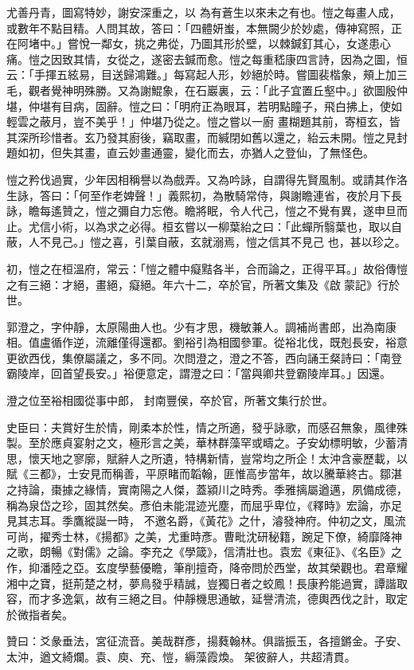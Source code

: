 \begin{pinyinscope}
 尤善丹青，圖寫特妙，謝安深重之，以
 為有蒼生以來未之有也。愷之每畫人成，或數年不點目精。人問其故，答曰：「四體妍蚩，本無闕少於妙處，傳神寫照，正在阿堵中。」嘗悅一鄰女，挑之弗從，乃圖其形於壁，以棘鍼釘其心，女遂患心痛。愷之因致其情，女從之，遂密去鍼而愈。愷之每重嵇康四言詩，因為之圖，恒云：「手揮五絃易，目送歸鴻難。」每寫起人形，妙絕於時。嘗圖裴楷象，頰上加三毛，觀者覺神明殊勝。又為謝鯤象，在石巖裏，云：「此子宜置丘壑中。」欲圖殷仲堪，仲堪有目病，固辭。愷之曰：「明府正為眼耳，若明點瞳子，飛白拂上，使如輕雲之蔽月，豈不美乎！」仲堪乃從之。愷之嘗以一廚
 畫糊題其前，寄桓玄，皆其深所珍惜者。玄乃發其廚後，竊取畫，而緘閉如舊以還之，紿云未開。愷之見封題如初，但失其畫，直云妙畫通靈，變化而去，亦猶人之登仙，了無怪色。



 愷之矜伐過實，少年因相稱譽以為戲弄。又為吟詠，自謂得先賢風制。或請其作洛生詠，答曰：「何至作老婢聲！」義熙初，為散騎常侍，與謝瞻連省，夜於月下長詠，瞻每遙贊之，愷之彌自力忘倦。瞻將眠，令人代己，愷之不覺有異，遂申旦而止。尤信小術，以為求之必得。桓玄嘗以一柳葉紿之曰：「此蟬所翳葉也，取以自蔽，人不見己。」愷之喜，引葉自蔽，玄就溺焉，愷之信其不見己
 也，甚以珍之。



 初，愷之在桓溫府，常云：「愷之體中癡黠各半，合而論之，正得平耳。」故俗傳愷之有三絕：才絕，畫絕，癡絕。年六十二，卒於官，所著文集及《啟蒙記》行於世。



 郭澄之，字仲靜，太原陽曲人也。少有才思，機敏兼人。調補尚書郎，出為南康相。值盧循作逆，流離僅得還都。劉裕引為相國參軍。從裕北伐，既剋長安，裕意更欲西伐，集僚屬議之，多不同。次問澄之，澄之不答，西向誦王粲詩曰：「南登霸陵岸，回首望長安。」裕便意定，謂澄之曰：「當與卿共登霸陵岸耳。」因還。



 澄之位至裕相國從事中郎，
 封南豐侯，卒於官，所著文集行於世。



 史臣曰：夫賞好生於情，剛柔本於性，情之所適，發乎詠歌，而感召無象，風律殊製。至於應貞宴射之文，極形言之美，華林群藻罕或疇之。子安幼標明敏，少蓄清思，懷天地之寥廓，賦辭人之所遺，特構新情，豈常均之所企！太沖含豪歷載，以賦《三都》，士安見而稱善，平原睹而韜翰，匪惟高步當年，故以騰華終古。鄒湛之持論，棗據之緣情，實南陽之人傑，蓋潁川之時秀。季雅摛屬遒邁，夙備成德，稱為泉岱之珍，固其然矣。彥伯未能混迹光塵，而屈乎卑位，《釋時》宏論，亦足見其志耳。季鷹縱誕一時，
 不邀名爵，《黃花》之什，濬發神府。仲初之文，風流可尚，擢秀士林，《揚都》之美，尤重時彥。曹毗沈研秘籍，踠足下僚，綺靡降神之歌，朗暢《對儒》之論。李充之《學箴》，信清壯也。袁宏《東征》、《名臣》之作，抑潘陸之亞。玄度學藝優瞻，筆削擅奇，降帝問於西堂，故其榮觀也。君章耀湘中之寶，挺荊楚之材，夢鳥發乎精誠，豈獨日者之蛟鳳！長康矜能過實，譚諧取容，而才多逸氣，故有三絕之目。仲靜機思通敏，延譽清流，德輿西伐之計，取定於微指者矣。



 贊曰：爻彖垂法，宮征流音。美哉群彥，揚蕤翰林。俱諧振玉，各擅鏘金。子安、太沖，遒文綺爛。袁、庾、充、愷，縟藻霞煥。
 架彼辭人，共超清貫。



\end{pinyinscope}